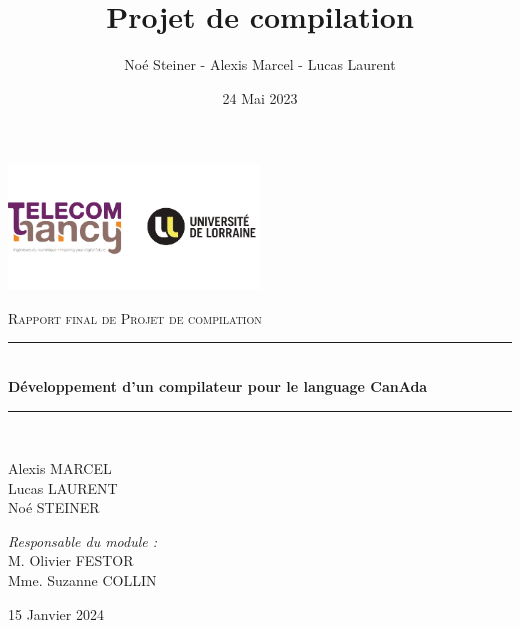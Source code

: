 \documentclass[french,a4paper]{article}
\title{Projet de compilation}
\author{Noé Steiner - Alexis Marcel - Lucas Laurent}
\date{24 Mai 2023}
\newcommand{\HRule}{\rule{\linewidth}{0.5mm}}
\begin{document}

    \begin{titlepage}
        \begin{center}

            \includegraphics[width=0.5\textwidth]{tele_univ}

            \textsc{\Large Rapport final de Projet de compilation}\\[1.5cm]

            \HRule \\[0.4cm]
            { \huge \bfseries Développement d'un compilateur pour le language CanAda\\[0.4cm] }

            \HRule \\[2cm]

            \begin{minipage}{0.4\textwidth}
                \begin{flushleft} \large
                Alexis MARCEL\\
                Lucas LAURENT\\
                Noé STEINER\\
                \end{flushleft}
            \end{minipage}
            \begin{minipage}{0.4\textwidth}
                \begin{flushright} \large
                \emph{Responsable du module :}\\
                M. Olivier FESTOR\\
                Mme. Suzanne COLLIN\\
                \end{flushright}
            \end{minipage}

            \vfill

            {\large 15 Janvier 2024}

        \end{center}
    \end{titlepage}
    \newpage
    \tableofcontents
    \newpage
\end{document}
